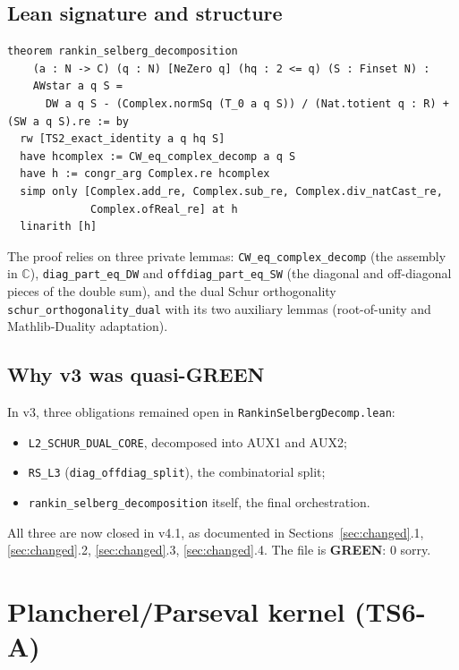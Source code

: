 \documentclass[11pt,a4paper]{article}
\theoremstyle{definition}
\newcommand{\GREEN}{\textcolor{green!50!black}{\textbf{GREEN}}}
\begin{document}
\subsection{Lean signature and structure}

\begin{lstlisting}
theorem rankin_selberg_decomposition
    (a : N -> C) (q : N) [NeZero q] (hq : 2 <= q) (S : Finset N) :
    AWstar a q S =
      DW a q S - (Complex.normSq (T_0 a q S)) / (Nat.totient q : R) + (SW a q S).re := by
  rw [TS2_exact_identity a q hq S]
  have hcomplex := CW_eq_complex_decomp a q S
  have h := congr_arg Complex.re hcomplex
  simp only [Complex.add_re, Complex.sub_re, Complex.div_natCast_re,
             Complex.ofReal_re] at h
  linarith [h]
\end{lstlisting}

The proof relies on three private lemmas: \verb|CW_eq_complex_decomp| (the assembly in $\mathbb{C}$), \verb|diag_part_eq_DW| and \verb|offdiag_part_eq_SW| (the diagonal and off-diagonal pieces of the double sum), and the dual Schur orthogonality \verb|schur_orthogonality_dual| with its two auxiliary lemmas (root-of-unity and Mathlib-Duality adaptation).

\subsection{Why v3 was quasi-GREEN}

In v3, three obligations remained open in \verb|RankinSelbergDecomp.lean|:
\begin{itemize}[noitemsep]
\item \verb|L2_SCHUR_DUAL_CORE|, decomposed into AUX1 and AUX2;
\item \verb|RS_L3| (\verb|diag_offdiag_split|), the combinatorial split;
\item \verb|rankin_selberg_decomposition| itself, the final orchestration.
\end{itemize}
All three are now closed in v4.1, as documented in Sections~\ref{sec:changed}.1, \ref{sec:changed}.2, \ref{sec:changed}.3, \ref{sec:changed}.4. The file is \GREEN{}: 0 sorry.

\section{Plancherel/Parseval kernel (TS6-A)}\label{sec:parseval}
\end{document}
